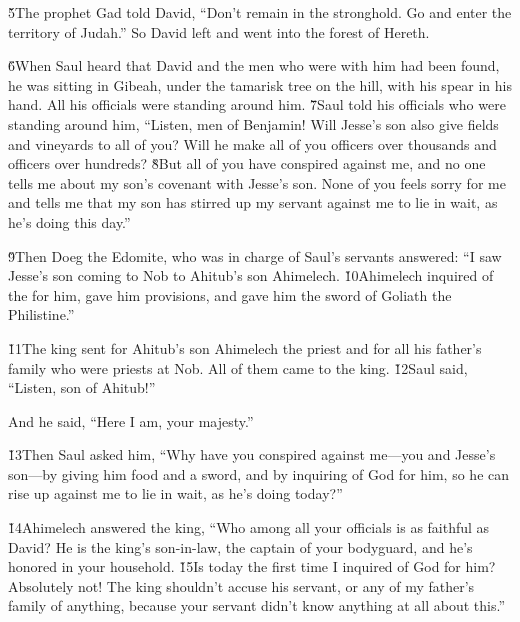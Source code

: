\v{5}The prophet Gad told David, ``Don't remain in the stronghold. Go and enter the territory of Judah.'' So David left and went into the forest of Hereth.

\v{6}When Saul heard that David and the men who were with him had been found, he was sitting in Gibeah, under the tamarisk tree on the hill, with his spear in his hand. All his officials were standing around him. \v{7}Saul told his officials who were standing around him, ``Listen, men of Benjamin! Will Jesse's son also give fields and vineyards to all of you? Will he make all of you officers over thousands and officers over hundreds? \v{8}But all of you have conspired against me, and no one tells me about my son's covenant with Jesse's son. None of you feels sorry for me and tells me that my son has stirred up my servant against me to lie in wait, as he's doing this day.''

\v{9}Then Doeg the Edomite, who was in charge of Saul's servants answered: ``I saw Jesse's son coming to Nob to Ahitub's son Ahimelech. \v{10}Ahimelech inquired of the  for him, gave him provisions, and gave him the sword of Goliath the Philistine.''

\v{11}The king sent for Ahitub's son Ahimelech the priest and for all his father's family who were priests at Nob. All of them came to the king. \v{12}Saul said, ``Listen, son of Ahitub!''

And he said, ``Here I am, your majesty.''

\v{13}Then Saul asked him, ``Why have you conspired against me---you and Jesse's son---by giving him food and a sword, and by inquiring of God for him, so he can rise up against me to lie in wait, as he's doing today?''

\v{14}Ahimelech answered the king, ``Who among all your officials is as faithful as David? He is the king's son-in-law, the captain of your bodyguard, and he's honored in your household. \v{15}Is today the first time I inquired of God for him? Absolutely not! The king shouldn't accuse his servant, or any of my father's family of anything, because your servant didn't know anything at all about this.''

